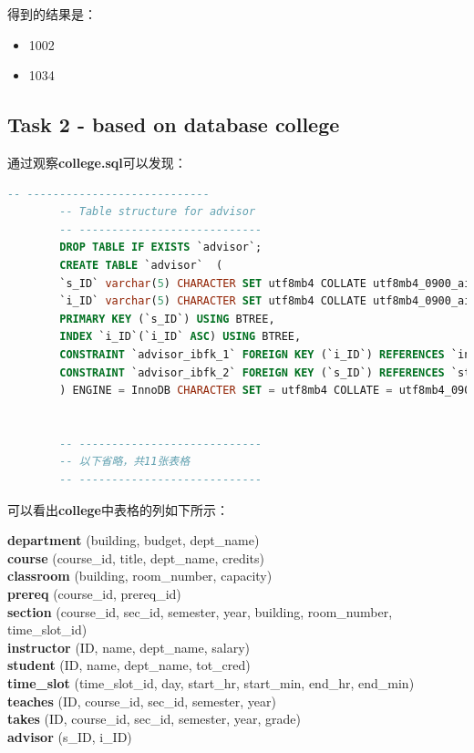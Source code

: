 \documentclass{article}
\begin{document}
    得到的结果是：
    \begin{itemize}
    	\item 1002
    	\item 1034
    \end{itemize}
    
    \subsection{Task 2 - based on database college}
    
    通过观察\textbf{college.sql}可以发现：
    
    \begin{lstlisting}[language=sql, title=activity.sql, tabsize=4]
    	-- ----------------------------
    	-- Table structure for advisor
    	-- ----------------------------
    	DROP TABLE IF EXISTS `advisor`;
    	CREATE TABLE `advisor`  (
    	`s_ID` varchar(5) CHARACTER SET utf8mb4 COLLATE utf8mb4_0900_ai_ci NOT NULL,
    	`i_ID` varchar(5) CHARACTER SET utf8mb4 COLLATE utf8mb4_0900_ai_ci NULL DEFAULT NULL,
    	PRIMARY KEY (`s_ID`) USING BTREE,
    	INDEX `i_ID`(`i_ID` ASC) USING BTREE,
    	CONSTRAINT `advisor_ibfk_1` FOREIGN KEY (`i_ID`) REFERENCES `instructor` (`ID`) ON DELETE SET NULL ON UPDATE RESTRICT,
    	CONSTRAINT `advisor_ibfk_2` FOREIGN KEY (`s_ID`) REFERENCES `student` (`ID`) ON DELETE CASCADE ON UPDATE RESTRICT
    	) ENGINE = InnoDB CHARACTER SET = utf8mb4 COLLATE = utf8mb4_0900_ai_ci ROW_FORMAT = Dynamic;
    	
   	
    	-- ----------------------------
    	-- 以下省略，共11张表格
    	-- ----------------------------
    \end{lstlisting}
    
    可以看出\textbf{college}中表格的列如下所示：
    
    \begin{tcolorbox}[title = {\textbf{ER Diagram 表格}}, colback = blue!25!white, colframe = blue!75!black]
    	\textbf{department} (building, budget, dept\_name) \\
    	\textbf{course} (course\_id, title, dept\_name, credits) \\
    	\textbf{classroom} (building, room\_number, capacity) \\
    	\textbf{prereq} (course\_id, prereq\_id) \\
    	\textbf{section} (course\_id, sec\_id, semester, year, building, room\_number, time\_slot\_id) \\
    	\textbf{instructor} (ID, name, dept\_name, salary) \\
    	\textbf{student} (ID, name, dept\_name, tot\_cred) \\
    	\textbf{time\_slot} (time\_slot\_id, day, start\_hr, start\_min, end\_hr, end\_min) \\
    	\textbf{teaches} (ID, course\_id, sec\_id, semester, year) \\
    	\textbf{takes} (ID, course\_id, sec\_id, semester, year, grade) \\
    	\textbf{advisor} (s\_ID, i\_ID)
    \end{tcolorbox}
    
\end{document}
